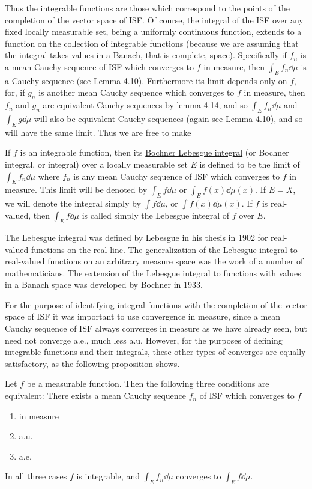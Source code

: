 Thus the integrable functions are those which correspond to the points of the completion of the vector space of ISF. Of course, the integral of the ISF over any fixed locally measurable set, being a uniformly continuous function, extends to a function on the collection of integrable functions (because we are assuming that the integral takes values in a Banach, that is complete, space). Specifically if $f_n$ is a mean Cauchy sequence of ISF which converges to $f$ in measure, then $\int_Ef_n\dd\mu$ is a Cauchy sequence (see Lemma 4.10). Furthermore its limit depends only on $f$, for, if $g_n$ is another mean Cauchy sequence which converges to $f$ in measure, then $f_n$ and $g_n$ are equivalent Cauchy sequences by lemma 4.14, and so $\int_Ef_n\dd\mu$ and $\int_Eg\dd\mu$ will also be equivalent Cauchy sequences (again see Lemma 4.10), and so will have the same limit. Thus we are free to make

\begin{definition}
If $f$ is an integrable function, then its \underline{Bochner Lebesgue integral} (or Bochner integral, or integral) over a locally measurable set $E$ is defined to be the limit of $\int_Ef_n\dd\mu$ where $f_n$ is any mean Cauchy sequence of ISF which converges to $f$ in measure. This limit will be denoted by $\int_Ef\dd\mu$ or $\int_Ef(x)\dd\mu(x)$. If $E=X$, we will denote the integral simply by $\int f\dd\mu$, or $\int f(x)\dd\mu(x)$. If $f$ is real-valued, then $\int_Ef\dd\mu$ is called simply the Lebesgue integral of $f$ over $E$.
\end{definition}

The Lebesgue integral was defined by Lebesgue in his thesis in 1902 for real-valued functions on the real line. The generalization of the Lebesgue integral to real-valued functions on an arbitrary measure space was the work of a number of mathematicians. The extension of the Lebesgue integral to functions with values in a Banach space was developed by Bochner in 1933.

For the purpose of identifying integral functions with the completion of the vector space of ISF it was important to use convergence in measure, since a mean Cauchy sequence of ISF always converges in measure as we have already seen, but need not converge a.e., much less a.u. However, for the purposes of defining integrable functions and their integrals, these other types of converges are equally satisfactory, as the following proposition shows.

\begin{proposition}
Let $f$ be a measurable function. Then the following three conditions are equivalent: There exists a mean Cauchy sequence $f_n$ of ISF which converges to $f$
\begin{enumerate}
    \item in measure
    \item a.u.
    \item a.e.
\end{enumerate}
In all three cases $f$ is integrable, and $\int_Ef_n\dd\mu$ converges to $\int_Ef\dd\mu$.
\end{proposition}

